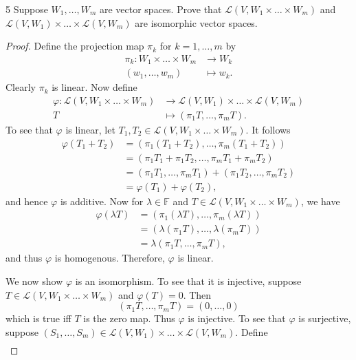 \documentclass{extarticle}
\newenvironment{problem}[1]{\begin{prob*}{#1}{}}{\end{prob*}}
\newcommand{\F}{\mathbb{F}}
\newcommand{\Hom}{\mathcal{L}}
\begin{document}
\begin{problem}{5}
Suppose $W_1,\dots, W_m$ are vector spaces.  Prove that $\Hom(V, W_1\times \dots \times W_m)$ and $\Hom(V, W_1)\times \dots \times \Hom(V, W_m)$ are isomorphic vector spaces.
\end{problem}
\begin{proof}
Define the projection map $\pi_k$ for $k=1,\dots,m$ by
\begin{align*}
\pi_k: W_1\times \dots \times W_m &\to W_k \\
          (w_1,\dots, w_m) &\mapsto w_k.
\end{align*}
Clearly $\pi_k$ is linear.  Now define
\begin{align*}
\varphi: \Hom(V, W_1\times \dots \times W_m) &\to \Hom(V, W_1)\times \dots \times \Hom(V, W_m)\\
             T &\mapsto (\pi_1T, \dots, \pi_mT).
\end{align*}
To see that $\varphi$ is linear, let $T_1, T_2\in \Hom(V, W_1\times \dots \times W_m)$.  It follows
\begin{align*}
\varphi(T_1 + T_2) &= (\pi_1(T_1 + T_2), \dots, \pi_m(T_1 + T_2))\\
&= (\pi_1T_1 + \pi_1T_2, \dots, \pi_mT_1 + \pi_mT_2)\\
&= (\pi_1T_1, \dots, \pi_mT_1) + (\pi_1T_2, \dots, \pi_mT_2)\\
&= \varphi(T_1) + \varphi(T_2),
\end{align*}
and hence $\varphi$ is additive.  Now for $\lambda\in\F$ and $T\in \Hom(V, W_1\times \dots \times W_m)$, we have
\begin{align*}
\varphi(\lambda T) &= (\pi_1(\lambda T), \dots, \pi_m(\lambda T))\\
&=  (\lambda(\pi_1 T), \dots, \lambda(\pi_m T))\\
&= \lambda(\pi_1T, \dots, \pi_mT),
\end{align*}
and thus $\varphi$ is homogenous.  Therefore, $\varphi$ is linear.
\par We now show $\varphi$ is an isomorphism.  To see that it is injective, suppose $T\in\Hom(V, W_1\times \dots \times W_m)$ and $\varphi(T) = 0$.
Then
\begin{equation*}
(\pi_1T, \dots, \pi_mT) = (0,\dots, 0)
\end{equation*}
which is true iff $T$ is the zero map.  Thus $\varphi$ is injective.  To see that $\varphi$ is surjective, suppose $(S_1,\dots, S_m)\in\Hom(V,W_1)\times \dots\times \Hom(V,W_m)$.  Define
\begin{align*}

\end{align*}
\end{proof}
\end{document}
